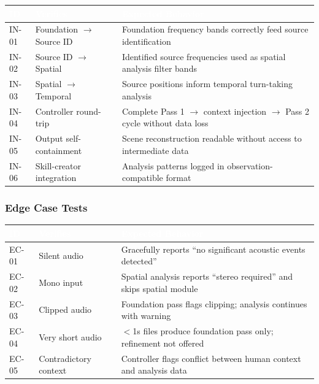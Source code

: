 \documentclass[11pt,letterpaper]{article}
\newcommand{\tableheader}[1]{\textbf{\sffamily\textcolor{white}{#1}}}
\begin{document}
\begin{center}
\begin{tabularx}{\textwidth}{C{1.2cm}L{4cm}X}
\toprule
{}
\tableheader{ID} & \tableheader{Verifies} & \tableheader{Expected Behavior} \\
\midrule
IN-01 & Foundation $\rightarrow$ Source ID & Foundation frequency bands correctly feed source identification \\
IN-02 & Source ID $\rightarrow$ Spatial & Identified source frequencies used as spatial analysis filter bands \\
IN-03 & Spatial $\rightarrow$ Temporal & Source positions inform temporal turn-taking analysis \\
IN-04 & Controller round-trip & Complete Pass 1 $\rightarrow$ context injection $\rightarrow$ Pass 2 cycle without data loss \\
IN-05 & Output self-containment & Scene reconstruction readable without access to intermediate data \\
IN-06 & Skill-creator integration & Analysis patterns logged in observation-compatible format \\
\bottomrule
\end{tabularx}
\end{center}

\subsubsection{Edge Case Tests}

\begin{center}
\begin{tabularx}{\textwidth}{C{1.2cm}L{4cm}X}
\toprule
{}
\tableheader{ID} & \tableheader{Verifies} & \tableheader{Expected Behavior} \\
\midrule
EC-01 & Silent audio & Gracefully reports ``no significant acoustic events detected'' \\
EC-02 & Mono input & Spatial analysis reports ``stereo required'' and skips spatial module \\
EC-03 & Clipped audio & Foundation pass flags clipping; analysis continues with warning \\
EC-04 & Very short audio & $<$1s files produce foundation pass only; refinement not offered \\
EC-05 & Contradictory context & Controller flags conflict between human context and analysis data \\
\bottomrule
\end{tabularx}
\end{center}
\end{document}
